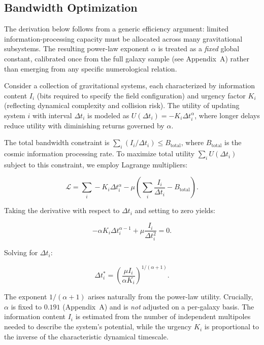 \documentclass[12pt,a4paper]{article}
\begin{document}
\subsection{Bandwidth Optimization}

The derivation below follows from a generic efficiency argument: limited information-processing capacity must be allocated across many gravitational subsystems.  The resulting power-law exponent $\alpha$ is treated as a \emph{fixed} global constant, calibrated once from the full galaxy sample (see Appendix~A) rather than emerging from any specific numerological relation.

Consider a collection of gravitational systems, each characterized by information content $I_i$ (bits required to specify the field configuration) and urgency factor $K_i$ (reflecting dynamical complexity and collision risk). The utility of updating system $i$ with interval $\Delta t_i$ is modeled as $U(\Delta t_i) = -K_i \Delta t_i^\alpha$, where longer delays reduce utility with diminishing returns governed by $\alpha$.

The total bandwidth constraint is $\sum_i (I_i / \Delta t_i) \leq B_\mathrm{total}$, where $B_\mathrm{total}$ is the cosmic information processing rate. To maximize total utility $\sum_i U(\Delta t_i)$ subject to this constraint, we employ Lagrange multipliers:

\begin{equation}
\mathcal{L} = \sum_i -K_i \Delta t_i^\alpha - \mu \left( \sum_i \frac{I_i}{\Delta t_i} - B_\mathrm{total} \right).
\end{equation}

Taking the derivative with respect to $\Delta t_i$ and setting to zero yields:

\begin{equation}
-\alpha K_i \Delta t_i^{\alpha-1} + \mu \frac{I_i}{\Delta t_i^2} = 0.
\end{equation}

Solving for $\Delta t_i$:

\begin{equation}
\Delta t_i^* = \left( \frac{\mu I_i}{\alpha K_i} \right)^{1/(\alpha+1)}.
\end{equation}

The exponent $1/(\alpha+1)$ arises naturally from the power-law utility. Crucially, $\alpha$ is fixed to $0.191$ (Appendix~A) and is \emph{not} adjusted on a per-galaxy basis. The information content $I_i$ is estimated from the number of independent multipoles needed to describe the system's potential, while the urgency $K_i$ is proportional to the inverse of the characteristic dynamical timescale.
\end{document}
